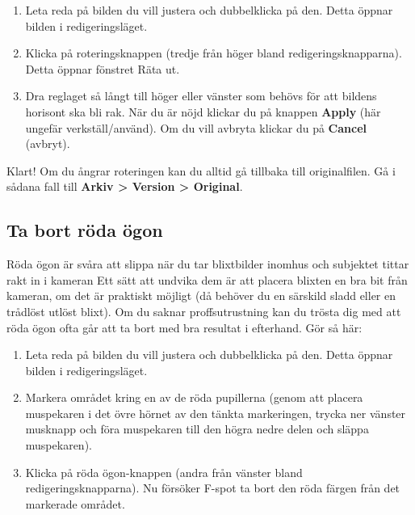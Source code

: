 \documentclass[a4paper,final]{memoir} %
\begin{document}
\begin{enumerate}

\item Leta reda på bilden du vill justera och dubbelklicka på den. Detta öppnar bilden i redigeringsläget. 

\item Klicka på roteringsknappen (tredje från höger bland redigeringsknapparna). Detta öppnar fönstret Räta ut.

\item Dra reglaget så långt till höger eller vänster som behövs för att bildens horisont ska bli rak. När du är nöjd klickar du på knappen \textbf{Apply} (här ungefär verkställ/använd). Om du vill avbryta klickar du på \textbf{Cancel} (avbryt).

\end{enumerate}



Klart! Om du ångrar roteringen kan du alltid gå tillbaka till originalfilen. Gå i sådana fall till \textbf{Arkiv \textgreater{} Version \textgreater{} Original}.


\subsection{Ta bort röda ögon}


Röda ögon är svåra att slippa när du tar blixtbilder inomhus och subjektet tittar rakt in i kameran Ett sätt att undvika dem är att placera blixten en bra bit från kameran, om det är praktiskt möjligt (då behöver du en särskild sladd eller en trådlöst utlöst blixt). Om du saknar proffsutrustning kan du trösta dig med att röda ögon ofta går att ta bort med bra resultat i efterhand. Gör så här:

\begin{enumerate}

\item Leta reda på bilden du vill justera och dubbelklicka på den. Detta öppnar bilden i redigeringsläget. 

\item Markera området kring en av de röda pupillerna (genom att placera muspekaren i det övre hörnet av den tänkta markeringen, trycka ner vänster musknapp och föra muspekaren till den högra nedre delen och släppa muspekaren).

\item Klicka på röda ögon-knappen (andra från vänster bland redigeringsknapparna). Nu försöker F-spot ta bort den röda färgen från det markerade området. 

\end{enumerate}
\end{document}
